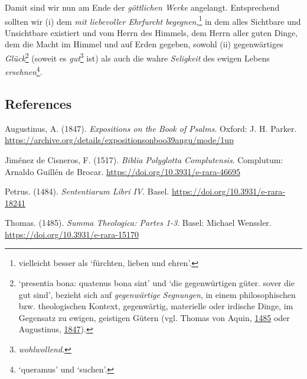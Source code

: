 \documentclass[
]{article}
\begin{document}
Damit sind wir nun am Ende der \emph{göttlichen Werke} angelangt.
Entsprechend sollten wir (i) dem \emph{mit liebevoller Ehrfurcht
begegnen},\footnote{vielleicht besser als `fürchten, lieben und ehren'.}
in dem alles Sichtbare und Unsichtbare existiert und vom Herrn des
Himmels, dem Herrn aller guten Dinge, dem die Macht im Himmel und auf
Erden gegeben, sowohl (ii) gegenwärtiges \emph{Glück}\footnote{`presentia
  bona: quatenus bona sint' und `die gegenwürtigen güter. sover die gut
  sind', bezieht sich auf \emph{gegenwärtige Segnungen}, in einem
  philosophischen bzw. theologischen Kontext, gegenwärtig, materielle
  oder irdische Dinge, im Gegensatz zu ewigen, geistigen Gütern (vgl.
  Thomas von Aquin, \href{https://doi.org/10.3931/e-rara-15170}{1485}
  oder Augustinus,
  \href{https://archive.org/details/expositionsonboo39augu/mode/1up}{1847}).}
(soweit es \emph{gut}\footnote{\emph{wohlwollend}.} ist) als auch die
wahre \emph{Seligkeit} des ewigen Lebens \emph{ersehnen}\footnote{`queramus'
  und `suchen'.}.

\hypertarget{references}{%
\subsection{References}\label{references}}

Augustinus, A. (1847). \emph{Expositions on the Book of Psalms}. Oxford:
J. H. Parker.
\url{https://archive.org/details/expositionsonboo39augu/mode/1up}

Jiménez de Cisneros, F. (1517). \emph{Biblia Polyglotta Complutensis}.
Complutum: Arnaldo Guillén de Brocar.
\url{https://doi.org/10.3931/e-rara-46695}

Petrus. (1484). \emph{Sententiarum Libri IV}. Basel.
\url{https://doi.org/10.3931/e-rara-18241}

Thomas. (1485). \emph{Summa Theologica: Partes 1-3}. Basel: Michael
Wenssler. \url{https://doi.org/10.3931/e-rara-15170}
\end{document}

